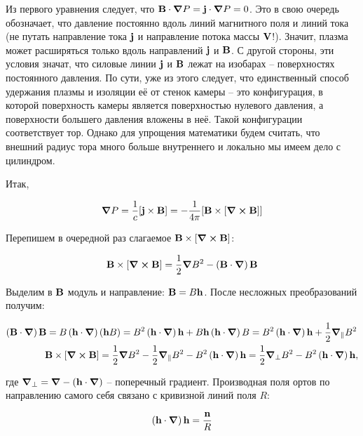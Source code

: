 \documentclass[10pt, a4paper]{article}
\begin{document}
Из первого уравнения следует, что $\vb{B}\cdot\grad{P} = \vb{j}\cdot\grad{P} = 0$. Это в свою очередь обозначает, что давление постоянно вдоль линий магнитного поля и линий тока (не путать направление тока $\vb{j}$ и направление потока массы $\vb{V}$!). Значит, плазма может расширяться только вдоль направлений $\vb{j}$ и $\vb{B}$. С другой стороны, эти условия значат, что силовые линии $\vb{j}$ и $\vb{B}$ лежат на изобарах -- поверхностях постоянного давления. По сути, уже из этого следует, что единственный способ удержания плазмы и изоляции её от стенок камеры -- это конфигурация, в которой поверхность камеры является поверхностью нулевого давления, а поверхности большего давления вложены в неё. Такой конфигурации соответствует тор. Однако для упрощения математики будем считать, что внешний радиус тора много больше внутреннего и локально мы имеем дело с цилиндром.

Итак, 

\begin{equation*}
	\grad{P} = \frac{1}{c}[\vb{j}\times\vb{B}] = -\frac{1}{4\pi}[\vb{B}\times[\curl{\vb{B}}]]
\end{equation*}

Перепишем в очередной раз слагаемое $\vb{B}\times[\curl{\vb{B}}]$:

\begin{equation*}
	\vb{B}\times[\curl{\vb{B}}] = \frac{1}{2}\grad{B^2} - \left( \vb{B}\cdot\grad \right)\vb{B}
\end{equation*}

Выделим в $\vb{B}$ модуль и направление: $\vb{B} = B\vb{h}$. После несложных преобразований получим:

\begin{align*}
	\left(\vb{B}\cdot\grad \right)\vb{B}=B\left(\vb{h}\cdot\grad \right)(\vb{h}B) = B^2\left(\vb{h}\cdot\grad \right)\vb{h} &+ B\vb{h}\left(\vb{h}\cdot\grad \right)B = B^2\left(\vb{h}\cdot\grad \right)\vb{h} + \frac{1}{2}\grad_\parallel{B^2} \\
	\vb{B}\times[\curl{\vb{B}}] = \frac{1}{2}\grad{B^2} - \frac{1}{2}\grad_\parallel B^2 &- B^2\left( \vb{h}\cdot\grad \right)\vb{h} = \frac{1}{2}\grad_\perp B^2 - B^2\left( \vb{h}\cdot\grad \right)\vb{h},
\end{align*}

где $\grad_\perp = \grad - \left( \vb{h}\cdot\grad \right)$ -- поперечный градиент. Производная поля ортов по направлению самого себя связано с кривизной линий поля $R$:

\begin{equation*}
	\left( \vb{h}\cdot\grad \right)\vb{h} = \frac{\vb{n}}{R}
\end{equation*}
\end{document}
